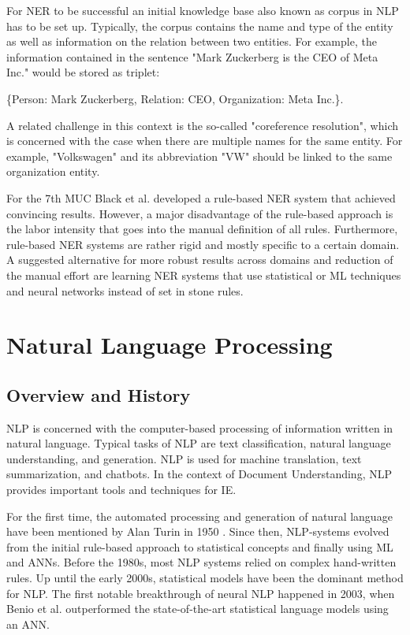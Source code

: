 For \ac{NER} to be successful an initial knowledge base also known as corpus in \ac{NLP} has to be set up. Typically, the corpus contains the name and type of the entity as well as information on the relation between two entities. For example, the information contained in the sentence "Mark Zuckerberg is the CEO of Meta Inc." would be stored as triplet: 

\{Person: Mark Zuckerberg, Relation: CEO, Organization: Meta Inc.\}.

A related challenge in this context is the so-called "coreference resolution", which is concerned with the case when there are multiple names for the same entity. For example, "Volkswagen" and its abbreviation "VW" should be linked to the same organization entity.
\cite{cowie1996information,cardie1997empirical}

For the 7th \ac{MUC} Black et al.\cite{black1998facile} developed a rule-based \ac{NER} system that achieved convincing results.
However, a major disadvantage of the rule-based approach is the labor intensity that goes into the manual definition of all rules. Furthermore, rule-based \ac{NER} systems are rather rigid and mostly specific to a certain domain. A suggested alternative for more robust results across domains and reduction of the manual effort are learning \ac{NER} systems that use statistical or \ac{ML} techniques and neural networks instead of set in stone rules.
\cite{hobbs2010information}

\newpage
\section{Natural Language Processing}
\subsection{Overview and History}
\ac{NLP} is concerned with the computer-based processing of information written in natural language. Typical tasks of \ac{NLP} are text classification, natural language understanding, and generation. \ac{NLP} is used for machine translation, text summarization, and chatbots. In the context of Document Understanding, \ac{NLP} provides important tools and techniques for \acf{IE}. \cite{aiello2002document}

For the first time, the automated processing and generation of natural language have been mentioned by Alan Turin in 1950 \cite{Turing1950}. Since then, \ac{NLP}-systems evolved from the initial rule-based approach to statistical concepts and finally using \ac{ML} and \acfp{ANN}. Before the 1980s, most \ac{NLP} systems relied on complex hand-written rules. Up until the early 2000s, statistical models have been the dominant method for \ac{NLP}. The first notable breakthrough of neural \ac{NLP} happened in 2003, when Benio et al. \cite{bengio} outperformed the state-of-the-art statistical language models using an \ac{ANN}.

